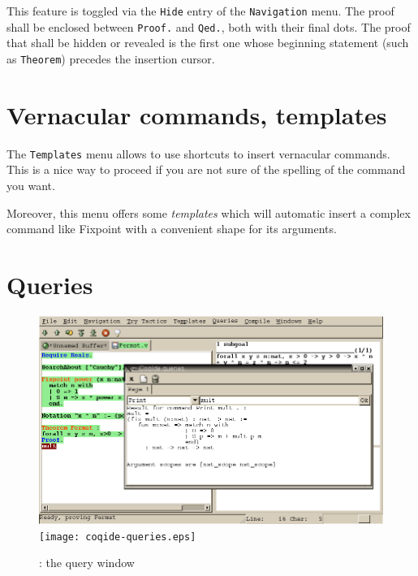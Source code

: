 This feature is toggled via the \texttt{Hide} entry of the \texttt{Navigation}
menu. The proof shall be enclosed between \texttt{Proof.} and \texttt{Qed.},
both with their final dots. The proof that shall be hidden or revealed is the
first one whose beginning statement (such as \texttt{Theorem}) precedes the
insertion cursor.
 
\section{Vernacular commands, templates}

The \texttt{Templates} menu allows to use shortcuts to insert
vernacular commands. This is a nice way to proceed if you are not sure
of the spelling of the command you want.

Moreover, this menu offers some \emph{templates} which will automatic
insert a complex command like Fixpoint with a convenient shape for its
arguments. 

\section{Queries}

\begin{figure}[t]
\begin{center}
\ifpdf  %
\includegraphics[width=1.0\textwidth]{coqide-queries.png}
\else
\texttt{[image: coqide-queries.eps]}
\fi
\end{center}
\caption{\CoqIDE{}: the query window}
\label{fig:querywindow}
\end{figure}


